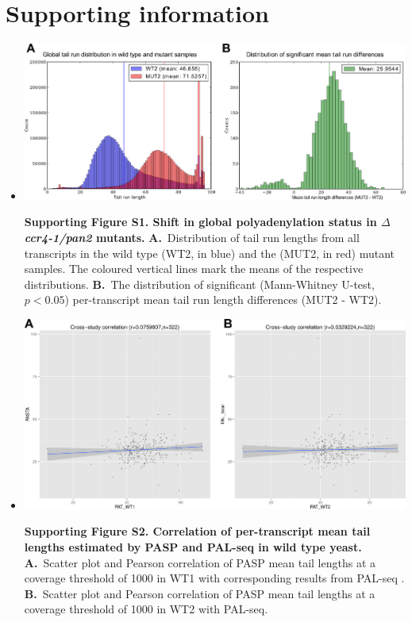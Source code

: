 \documentclass[10pt]{article}
\begin{document}
\newpage 

\section*{Supporting information}

\begin{itemize}

\item[]{
\begin{center}
\includegraphics[scale=0.9]{FigureS1.png}
\end{center}

\textbf{Supporting Figure S1. Shift in global polyadenylation status in \textit{$\Delta$ccr4-1/pan2} mutants.} \textbf{A.}~Distribution of tail run lengths from all transcripts in the wild type (WT2, in blue) and the (MUT2, in red) mutant samples. The coloured vertical lines mark the means of the respective distributions.
\textbf{B.}~The distribution of significant (Mann-Whitney U-test, $p < 0.05$) per-transcript mean tail run length differences (MUT2 - WT2).
}
\newpage

\item[]{
\begin{center}
\includegraphics[scale=0.9]{FigureS2.png}
\end{center}

\textbf{Supporting Figure S2. Correlation of per-transcript mean tail lengths estimated by PASP and PAL-seq in wild type yeast.} \textbf{A.}~Scatter plot and Pearson correlation of PASP mean tail lengths at a coverage threshold of 1000 in WT1 with corresponding results from PAL-seq \cite{subtelny14}. \textbf{B.}~Scatter plot and Pearson correlation of PASP mean tail lengths at a coverage threshold of 1000 in WT2 with PAL-seq.}
\newpage


\end{itemize}
\end{document}
